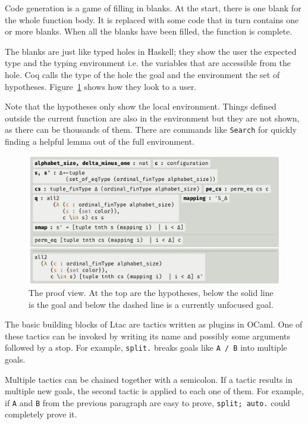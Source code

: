 \documentclass[english, 12pt, a4paper, sci, a-1b, online]{aaltothesis}
\newcommand\icoq[1]{\texttt{#1}}
\begin{document}
Code generation is a game of filling in blanks. At the start, there is one blank for the whole function body. It is replaced with some code that in turn contains one or more blanks. When all the blanks have been filled, the function is complete.

The blanks are just like typed holes in Haskell; they show the user the expected type and the typing environment i.e. the variables that are accessible from the hole. Coq calls the type of the hole the goal and the environment the set of hypotheses. Figure~\ref{proofview} shows how they look to a user.

Note that the hypotheses only show the local environment. Things defined outside the current function are also in the environment but they are not shown, as there can be thousands of them. There are commands like \icoq{Search} for quickly finding a helpful lemma out of the full environment.

\begin{figure}[h]
  \includegraphics[scale=0.7]{proof_view}
  \caption{The proof view. At the top are the hypotheses, below the solid line is the goal and below the dashed line is a currently unfocused goal.}
  \label{proofview}
\end{figure}

The basic building blocks of Ltac are tactics written as plugins in OCaml. One of these tactics can be invoked by writing its name and possibly some arguments followed by a stop. For example, \icoq{split.} breaks goals like \icoq{A /\ B} into multiple goals.

Multiple tactics can be chained together with a semicolon. If a tactic results in multiple new goals, the second tactic is applied to each one of them. For example, if \icoq{A} and \icoq{B} from the previous paragraph are easy to prove, \icoq{split; auto.} could completely prove it.
\end{document}
